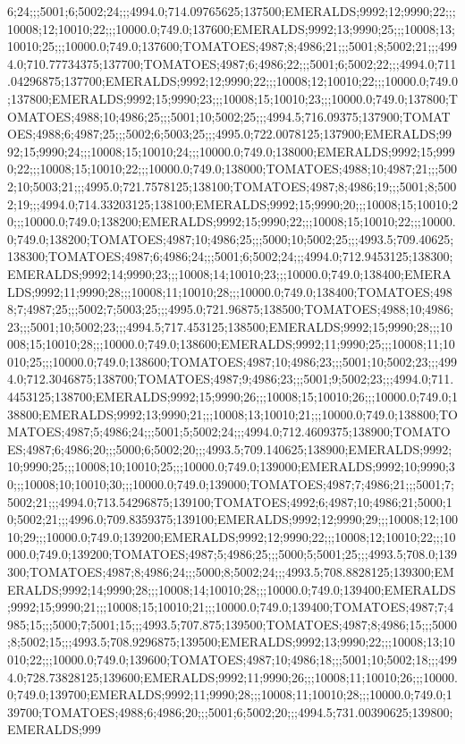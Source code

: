 6;24;;;5001;6;5002;24;;;4994.0;714.09765625;137500;EMERALDS;9992;12;9990;22;;;10008;12;10010;22;;;10000.0;749.0;137600;EMERALDS;9992;13;9990;25;;;10008;13;10010;25;;;10000.0;749.0;137600;TOMATOES;4987;8;4986;21;;;5001;8;5002;21;;;4994.0;710.77734375;137700;TOMATOES;4987;6;4986;22;;;5001;6;5002;22;;;4994.0;711.04296875;137700;EMERALDS;9992;12;9990;22;;;10008;12;10010;22;;;10000.0;749.0;137800;EMERALDS;9992;15;9990;23;;;10008;15;10010;23;;;10000.0;749.0;137800;TOMATOES;4988;10;4986;25;;;5001;10;5002;25;;;4994.5;716.09375;137900;TOMATOES;4988;6;4987;25;;;5002;6;5003;25;;;4995.0;722.0078125;137900;EMERALDS;9992;15;9990;24;;;10008;15;10010;24;;;10000.0;749.0;138000;EMERALDS;9992;15;9990;22;;;10008;15;10010;22;;;10000.0;749.0;138000;TOMATOES;4988;10;4987;21;;;5002;10;5003;21;;;4995.0;721.7578125;138100;TOMATOES;4987;8;4986;19;;;5001;8;5002;19;;;4994.0;714.33203125;138100;EMERALDS;9992;15;9990;20;;;10008;15;10010;20;;;10000.0;749.0;138200;EMERALDS;9992;15;9990;22;;;10008;15;10010;22;;;10000.0;749.0;138200;TOMATOES;4987;10;4986;25;;;5000;10;5002;25;;;4993.5;709.40625;138300;TOMATOES;4987;6;4986;24;;;5001;6;5002;24;;;4994.0;712.9453125;138300;EMERALDS;9992;14;9990;23;;;10008;14;10010;23;;;10000.0;749.0;138400;EMERALDS;9992;11;9990;28;;;10008;11;10010;28;;;10000.0;749.0;138400;TOMATOES;4988;7;4987;25;;;5002;7;5003;25;;;4995.0;721.96875;138500;TOMATOES;4988;10;4986;23;;;5001;10;5002;23;;;4994.5;717.453125;138500;EMERALDS;9992;15;9990;28;;;10008;15;10010;28;;;10000.0;749.0;138600;EMERALDS;9992;11;9990;25;;;10008;11;10010;25;;;10000.0;749.0;138600;TOMATOES;4987;10;4986;23;;;5001;10;5002;23;;;4994.0;712.3046875;138700;TOMATOES;4987;9;4986;23;;;5001;9;5002;23;;;4994.0;711.4453125;138700;EMERALDS;9992;15;9990;26;;;10008;15;10010;26;;;10000.0;749.0;138800;EMERALDS;9992;13;9990;21;;;10008;13;10010;21;;;10000.0;749.0;138800;TOMATOES;4987;5;4986;24;;;5001;5;5002;24;;;4994.0;712.4609375;138900;TOMATOES;4987;6;4986;20;;;5000;6;5002;20;;;4993.5;709.140625;138900;EMERALDS;9992;10;9990;25;;;10008;10;10010;25;;;10000.0;749.0;139000;EMERALDS;9992;10;9990;30;;;10008;10;10010;30;;;10000.0;749.0;139000;TOMATOES;4987;7;4986;21;;;5001;7;5002;21;;;4994.0;713.54296875;139100;TOMATOES;4992;6;4987;10;4986;21;5000;10;5002;21;;;4996.0;709.8359375;139100;EMERALDS;9992;12;9990;29;;;10008;12;10010;29;;;10000.0;749.0;139200;EMERALDS;9992;12;9990;22;;;10008;12;10010;22;;;10000.0;749.0;139200;TOMATOES;4987;5;4986;25;;;5000;5;5001;25;;;4993.5;708.0;139300;TOMATOES;4987;8;4986;24;;;5000;8;5002;24;;;4993.5;708.8828125;139300;EMERALDS;9992;14;9990;28;;;10008;14;10010;28;;;10000.0;749.0;139400;EMERALDS;9992;15;9990;21;;;10008;15;10010;21;;;10000.0;749.0;139400;TOMATOES;4987;7;4985;15;;;5000;7;5001;15;;;4993.5;707.875;139500;TOMATOES;4987;8;4986;15;;;5000;8;5002;15;;;4993.5;708.9296875;139500;EMERALDS;9992;13;9990;22;;;10008;13;10010;22;;;10000.0;749.0;139600;TOMATOES;4987;10;4986;18;;;5001;10;5002;18;;;4994.0;728.73828125;139600;EMERALDS;9992;11;9990;26;;;10008;11;10010;26;;;10000.0;749.0;139700;EMERALDS;9992;11;9990;28;;;10008;11;10010;28;;;10000.0;749.0;139700;TOMATOES;4988;6;4986;20;;;5001;6;5002;20;;;4994.5;731.00390625;139800;EMERALDS;999